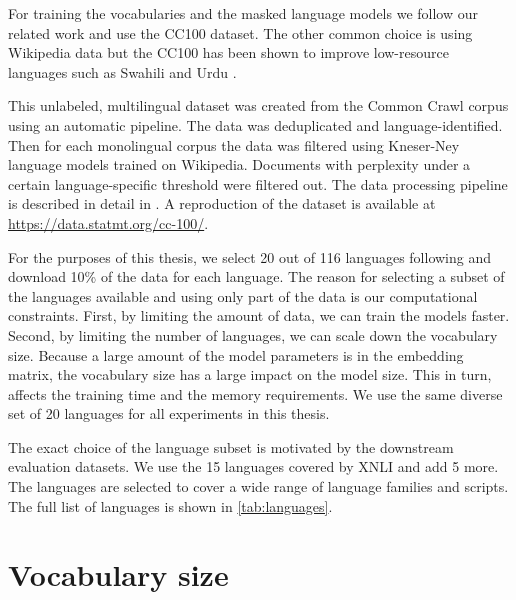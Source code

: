 For training the vocabularies and the masked language models we follow our related work \cite{conneau_unsupervised_2020,chung_improving_2020,liang_xlm-v_2023} and use the CC100 dataset. The other common choice is using Wikipedia data \cite{devlin_bert_2019,zheng_allocating_2021} but the CC100 has been shown to improve low-resource languages such as Swahili and Urdu \cite{conneau_unsupervised_2020}.

This unlabeled, multilingual dataset was created from the Common Crawl corpus using an automatic pipeline. The data was deduplicated and language-identified. Then for each monolingual corpus the data was filtered using Kneser-Ney language models trained on Wikipedia. Documents with perplexity under a certain language-specific threshold were filtered out. The data processing pipeline is described in detail in \citet{wenzek_ccnet_2020}. A reproduction of the dataset is available at \url{https://data.statmt.org/cc-100/}.

For the purposes of this thesis, we select 20 out of 116 languages following \citet{limisiewicz_tokenization_2023} and download 10\% of the data for each language. The reason for selecting a subset of the languages available and using only part of the data is our computational constraints. First, by limiting the amount of data, we can train the models faster. Second, by limiting the number of languages, we can scale down the vocabulary size. Because a large amount of the model parameters is in the embedding matrix, the vocabulary size has a large impact on the model size. This in turn, affects the training time and the memory requirements. We use the same diverse set of 20 languages for all experiments in this thesis.

The exact choice of the language subset is motivated by the downstream evaluation datasets. We use the 15 languages covered by XNLI and add 5 more. The languages are selected to cover a wide range of language families and scripts. The full list of languages is shown in \autoref{tab:languages}.


\section{Vocabulary size}
\label{sec:vocabulary_size}


